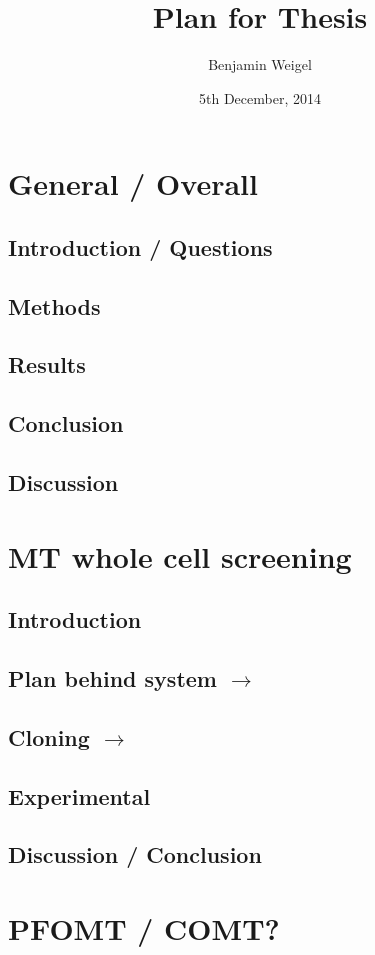 \documentclass[10pt]{book}\usepackage[]{graphicx}\usepackage[]{color}
\author{Benjamin Weigel}
\title{Plan for Thesis}
\date{5th December, 2014}
\begin{document}
\sffamily
\maketitle
\tableofcontents

\chapter{General / Overall}
\section{Introduction / Questions}
\section{Methods}
\section{Results}
\section{Conclusion}
\section{Discussion}

\chapter{MT whole cell screening}
\section{Introduction}
\section{Plan behind system $\rightarrow$}
\section{Cloning $\rightarrow$}
\section{Experimental}
\section{Discussion / Conclusion}

\chapter{PFOMT / COMT?}
\end{document}
